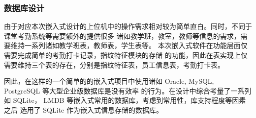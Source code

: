     \subsubsection{数据库设计}

    由于对应本次嵌入式设计的上位机中的操作需求相对较为简单直白。同时，不同于课堂考勤系统等需要额外的提供很多
    诸如教学班，教室，教师等信息的需求，需要维持一系列诸如教学班表，教师表，学生表等。\cite{基于WiFi探针的智能考勤系统设计}
    本次嵌入式软件在功能层面仅需要完成简单的考勤打卡记录，指纹特征模块的存储
    的功能，因此在表实现上仅需要维持三个表的存在，分别是指纹特征表，员工信息表，考勤打卡表。

    因此，在这样的一个简单的的嵌入式项目中使用诸如 Oracle, MySQL, PostgreSQL 等大型企业级数据库是没有效率
    的行为。在设计中综合考量了一系列如 SQLite， LMDB 等嵌入式常用的数据库，考虑到常用性，库支持程度等因素之后
    选用了 SQLite 作为嵌入式信息存储的数据库。

